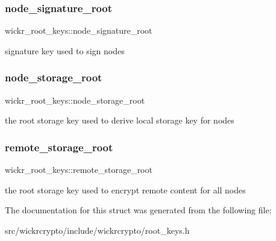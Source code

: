 \subsubsection{\texorpdfstring{node\+\_\+signature\+\_\+root}{node\_signature\_root}}
{\footnotesize\ttfamily wickr\+\_\+root\+\_\+keys\+::node\+\_\+signature\+\_\+root}

signature key used to sign nodes \mbox{\label{structwickr__root__keys_ada908a5fa4aaf7c8b9a4b496c99e595a}} 
\subsubsection{\texorpdfstring{node\+\_\+storage\+\_\+root}{node\_storage\_root}}
{\footnotesize\ttfamily wickr\+\_\+root\+\_\+keys\+::node\+\_\+storage\+\_\+root}

the root storage key used to derive local storage key for nodes \mbox{\label{structwickr__root__keys_a9bf1ff10b669493393e2bf918f5d4090}} 
\subsubsection{\texorpdfstring{remote\+\_\+storage\+\_\+root}{remote\_storage\_root}}
{\footnotesize\ttfamily wickr\+\_\+root\+\_\+keys\+::remote\+\_\+storage\+\_\+root}

the root storage key used to encrypt remote content for all nodes 

The documentation for this struct was generated from the following file\+:\begin{DoxyCompactItemize}
\item 
src/wickrcrypto/include/wickrcrypto/root\+\_\+keys.\+h\end{DoxyCompactItemize}
